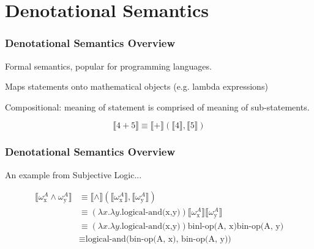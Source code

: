 \documentclass{beamer}
\begin{document}

\section{Denotational Semantics}

\begin{frame}
\frametitle{Denotational Semantics Overview}

Formal semantics, popular for programming languages.

Maps statements onto mathematical objects (e.g. lambda expressions)

Compositional: meaning of statement is comprised of meaning of sub-statements.

$$\llbracket 4 + 5 \rrbracket \equiv \llbracket + \rrbracket \left(\llbracket 4 \rrbracket, \llbracket 5 \rrbracket\right)$$

\end{frame}

\begin{frame}
\frametitle{Denotational Semantics Overview}

An example from Subjective Logic...

\begin{equation}
\begin{split}
\llbracket \omega^{A}_{\mbox{x}} \land \omega^{A}_{\mbox{y}} \rrbracket
    & \equiv \llbracket \land \rrbracket \left(
                 \llbracket \omega^{A}_{\mbox{x}} \rrbracket,
                 \llbracket \omega^{A}_{\mbox{y}} \rrbracket
              \right) \\
    & \equiv \left(\lambda x. \lambda y. \mbox{logical-and(x,y)}\right)
             \llbracket \omega^{A}_{\mbox{x}} \rrbracket
             \llbracket \omega^{A}_{\mbox{y}} \rrbracket \\
    & \equiv \left(\lambda x. \lambda y. \mbox{logical-and(x,y)}\right)
             \mbox{binl-op(A, x)} \mbox{bin-op(A, y)} \\
    & \equiv \mbox{logical-and(bin-op(A, x), bin-op(A, y))}
\end{split}
\end{equation}

\end{frame}
\end{document}
